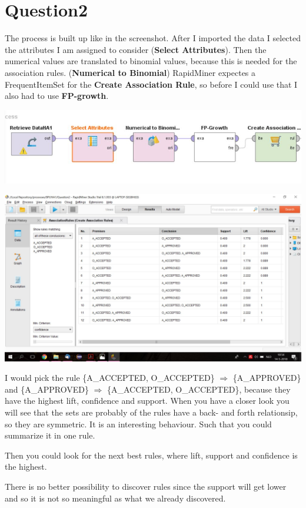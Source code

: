 \section*{Question2}
The process is built up like in the screenshot. After I imported the data I
selected the attributes I am assigned to consider (\textbf{Select Attributes}).
Then the numerical values are translated to binomial values, because this is needed for the association
rules. (\textbf{Numerical to Binomial}) RapidMiner expectes a FrequentItemSet
for the \textbf{Create Association Rule}, so before I could use that I also had
to use \textbf{FP-growth}.

\includegraphics[width=\textwidth]{Question2Process.jpg}

\includegraphics[width=\textwidth]{Question2Rapid.jpg}

I would pick the rule \{A\_ACCEPTED, O\_ACCEPTED\} $\Rightarrow$	\{A\_APPROVED\}
and \{A\_APPROVED\} $\Rightarrow$	\{A\_ACCEPTED, O\_ACCEPTED\}, because they
have the highest lift, confidence and support. When you have a closer look you
will see that the sets are probably of the rules have a back- and forth
relationsip, so they are symmetric. It is an interesting behaviour. Such that
you could summarize it in one rule. 

Then you could look for the next best rules, where lift, support and confidence is the highest.

There is no better possibility to discover rules since the support will get
lower and so it is not so meaningful as what we already discovered.
